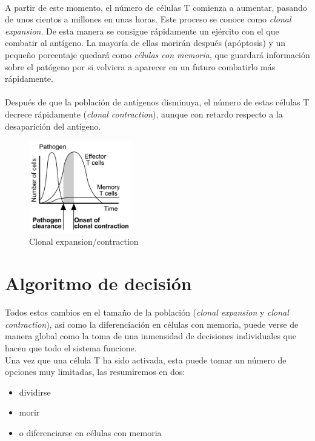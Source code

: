 \documentclass{article}
\begin{document}
 	 \\
 	 A partir de este momento, el número de células T comienza a aumentar, pasando de unos cientos a millones en unas horas. Este proceso se conoce como \textit{clonal expansion}. De esta manera se consigue rápidamente un ejército con el que combatir al antígeno. La mayoría de ellas morirán después (apóptosis) y un pequeño porcentaje quedará como \textit{células con memoria}, que guardará información sobre el patógeno por si volviera a aparecer en un futuro combatirlo más rápidamente.
 	 \\
 	 \\
 	 Después de que la población de antígenos disminuya, el número de estas células T decrece rápidamente (\textit{clonal contraction}), aunque con retardo respecto a la desaparición del antígeno.
 	 
 	 \begin{figure}[h!]
 	 	\centering
 	 	\includegraphics[width=0.4\textwidth]{clonalExpContr}
 	 	\caption{Clonal expansion/contraction}
 	 	\label{fig:ejemplo}
 	 \end{figure}
	 
	 \section{Algoritmo de decisión}
	 Todos estos cambios en el tamaño de la población (\textit{clonal expansion} y \textit{clonal contraction}), así como la diferenciación en células con memoria, puede verse de manera global como la toma de una inmensidad de decisiones individuales que hacen que todo el sistema funcione.
	 \\
	 Una vez que una célula T ha sido activada, esta puede tomar un número de opciones muy limitadas, las resumiremos en dos:
	 \begin{itemize}
	 	\item dividirse
	 	\item morir
	 	\item o diferenciarse en células con memoria
	 \end{itemize}
	 
\end{document}
